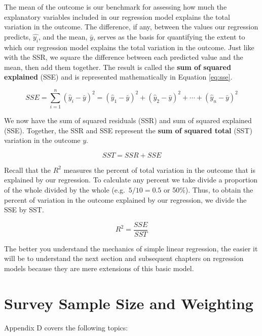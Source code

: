 \documentclass[
]{book}
\begin{document}
The mean of the outcome is our benchmark for assessing how much the explanatory variables included in our regression model explains the total variation in the outcome. The difference, if any, between the values our regression predicts, \(\hat{y_i}\), and the mean, \(\bar{y}\), serves as the basis for quantifying the extent to which our regression model explains the total variation in the outcome. Just like with the SSR, we square the difference between each predicted value and the mean, then add them together. The result is called the \textbf{sum of squared explained} (SSE) and is represented mathematically in Equation \eqref{eq:sse}.

\begin{equation}
SSE=\sum _{i=1}^{n}(\hat{y}_{i}-\bar{y})^2= (\hat{y}_{1}-\bar{y})^2+(\hat{y}_{2}-\bar{y})^2+\cdots +(\hat{y}_{n}-\bar{y})^2
\label{eq:sse}
\end{equation}

We now have the sum of squared residuals (SSR) and sum of squared explained (SSE). Together, the SSR and SSE represent the \textbf{sum of squared total} (SST) variation in the outcome \(y\).

\begin{equation}
SST = SSR + SSE
\label{eq:sst}
\end{equation}

Recall that the \(R^2\) measures the percent of total variation in the outcome that is explained by our regression. To calculate any percent we take divide a proportion of the whole divided by the whole (e.g.~\(5/10 = 0.5\) or 50\%). Thus, to obtain the percent of variation in the outcome explained by our regression, we divide the SSE by SST.

\begin{equation}
R^2 = {\frac{SSE}{SST}}
\label{eq:r2}
\end{equation}

The better you understand the mechanics of simple linear regression, the easier it will be to understand the next section and subsequent chapters on regression models because they are mere extensions of this basic model.

\hypertarget{appendixD}{%
\chapter{Survey Sample Size and Weighting}\label{appendixD}}

Appendix D covers the following topics:
\end{document}
